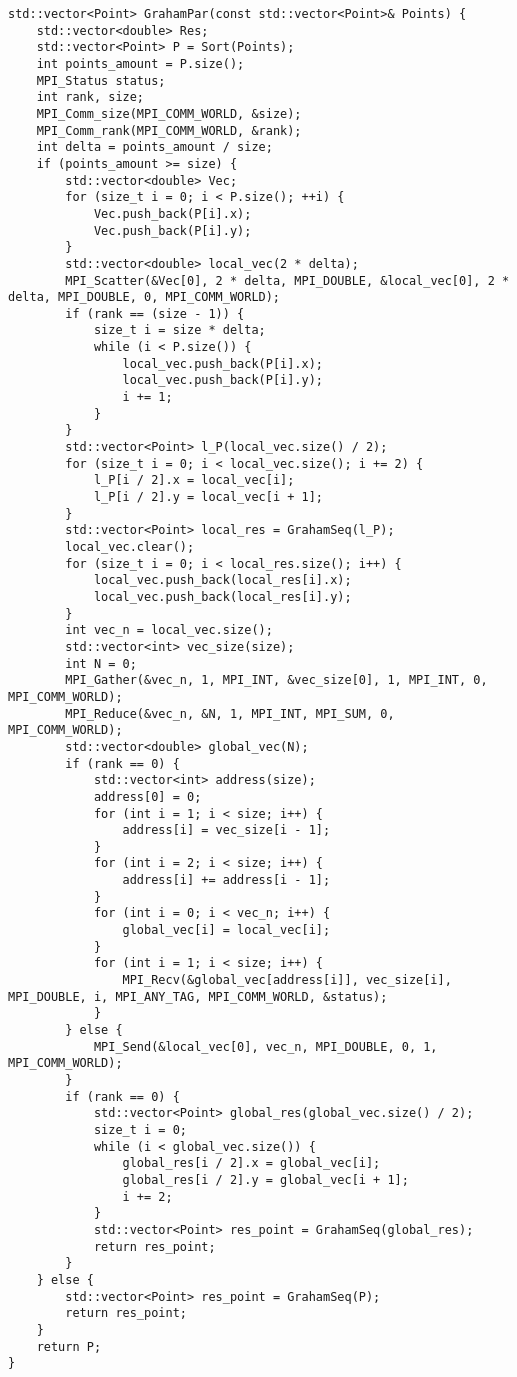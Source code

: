 \documentclass{report}
\begin{document}
\begin{lstlisting}
std::vector<Point> GrahamPar(const std::vector<Point>& Points) {
    std::vector<double> Res;
    std::vector<Point> P = Sort(Points);
    int points_amount = P.size();
    MPI_Status status;
    int rank, size;
    MPI_Comm_size(MPI_COMM_WORLD, &size);
    MPI_Comm_rank(MPI_COMM_WORLD, &rank);
    int delta = points_amount / size;
    if (points_amount >= size) {
        std::vector<double> Vec;
        for (size_t i = 0; i < P.size(); ++i) {
            Vec.push_back(P[i].x);
            Vec.push_back(P[i].y);
        }
        std::vector<double> local_vec(2 * delta);
        MPI_Scatter(&Vec[0], 2 * delta, MPI_DOUBLE, &local_vec[0], 2 * delta, MPI_DOUBLE, 0, MPI_COMM_WORLD);
        if (rank == (size - 1)) {
            size_t i = size * delta;
            while (i < P.size()) {
                local_vec.push_back(P[i].x);
                local_vec.push_back(P[i].y);
                i += 1;
            }
        }
        std::vector<Point> l_P(local_vec.size() / 2);
        for (size_t i = 0; i < local_vec.size(); i += 2) {
            l_P[i / 2].x = local_vec[i];
            l_P[i / 2].y = local_vec[i + 1];
        }
        std::vector<Point> local_res = GrahamSeq(l_P);
        local_vec.clear();
        for (size_t i = 0; i < local_res.size(); i++) {
            local_vec.push_back(local_res[i].x);
            local_vec.push_back(local_res[i].y);
        }
        int vec_n = local_vec.size();
        std::vector<int> vec_size(size);
        int N = 0;
        MPI_Gather(&vec_n, 1, MPI_INT, &vec_size[0], 1, MPI_INT, 0, MPI_COMM_WORLD);
        MPI_Reduce(&vec_n, &N, 1, MPI_INT, MPI_SUM, 0, MPI_COMM_WORLD);
        std::vector<double> global_vec(N);
        if (rank == 0) {
            std::vector<int> address(size);
            address[0] = 0;
            for (int i = 1; i < size; i++) {
                address[i] = vec_size[i - 1];
            }
            for (int i = 2; i < size; i++) {
                address[i] += address[i - 1];
            }
            for (int i = 0; i < vec_n; i++) {
                global_vec[i] = local_vec[i];
            }
            for (int i = 1; i < size; i++) {
                MPI_Recv(&global_vec[address[i]], vec_size[i], MPI_DOUBLE, i, MPI_ANY_TAG, MPI_COMM_WORLD, &status);
            }
        } else {
            MPI_Send(&local_vec[0], vec_n, MPI_DOUBLE, 0, 1, MPI_COMM_WORLD);
        }
        if (rank == 0) {
            std::vector<Point> global_res(global_vec.size() / 2);
            size_t i = 0;
            while (i < global_vec.size()) {
                global_res[i / 2].x = global_vec[i];
                global_res[i / 2].y = global_vec[i + 1];
                i += 2;
            }
            std::vector<Point> res_point = GrahamSeq(global_res);
            return res_point;
        }
    } else {
        std::vector<Point> res_point = GrahamSeq(P);
        return res_point;
    }
    return P;
}

\end{lstlisting}
\end{document}
